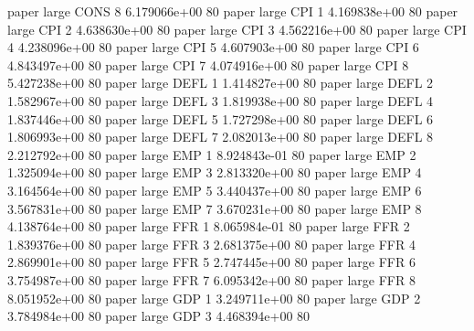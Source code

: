               paper      large     CONS                 8 6.179066e+00 80
              paper      large      CPI                 1 4.169838e+00 80
              paper      large      CPI                 2 4.638630e+00 80
              paper      large      CPI                 3 4.562216e+00 80
              paper      large      CPI                 4 4.238096e+00 80
              paper      large      CPI                 5 4.607903e+00 80
              paper      large      CPI                 6 4.843497e+00 80
              paper      large      CPI                 7 4.074916e+00 80
              paper      large      CPI                 8 5.427238e+00 80
              paper      large     DEFL                 1 1.414827e+00 80
              paper      large     DEFL                 2 1.582967e+00 80
              paper      large     DEFL                 3 1.819938e+00 80
              paper      large     DEFL                 4 1.837446e+00 80
              paper      large     DEFL                 5 1.727298e+00 80
              paper      large     DEFL                 6 1.806993e+00 80
              paper      large     DEFL                 7 2.082013e+00 80
              paper      large     DEFL                 8 2.212792e+00 80
              paper      large      EMP                 1 8.924843e-01 80
              paper      large      EMP                 2 1.325094e+00 80
              paper      large      EMP                 3 2.813320e+00 80
              paper      large      EMP                 4 3.164564e+00 80
              paper      large      EMP                 5 3.440437e+00 80
              paper      large      EMP                 6 3.567831e+00 80
              paper      large      EMP                 7 3.670231e+00 80
              paper      large      EMP                 8 4.138764e+00 80
              paper      large      FFR                 1 8.065984e-01 80
              paper      large      FFR                 2 1.839376e+00 80
              paper      large      FFR                 3 2.681375e+00 80
              paper      large      FFR                 4 2.869901e+00 80
              paper      large      FFR                 5 2.747445e+00 80
              paper      large      FFR                 6 3.754987e+00 80
              paper      large      FFR                 7 6.095342e+00 80
              paper      large      FFR                 8 8.051952e+00 80
              paper      large      GDP                 1 3.249711e+00 80
              paper      large      GDP                 2 3.784984e+00 80
              paper      large      GDP                 3 4.468394e+00 80
